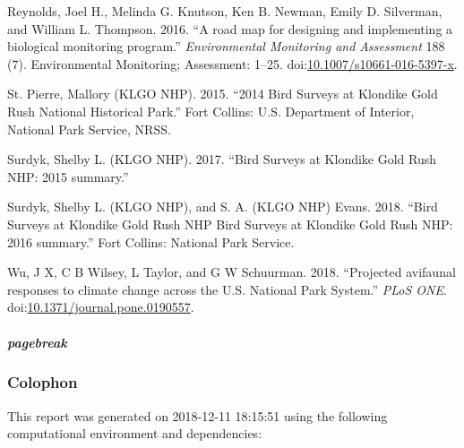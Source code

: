 \documentclass[]{article}
\let\oldsubparagraph\subparagraph
\renewcommand{\subparagraph}[1]{\oldsubparagraph{#1}\mbox{}}
\begin{document}
\hypertarget{ref-Reynolds2016}{}
Reynolds, Joel H., Melinda G. Knutson, Ken B. Newman, Emily D.
Silverman, and William L. Thompson. 2016. ``A road map for designing and
implementing a biological monitoring program.'' \emph{Environmental
Monitoring and Assessment} 188 (7). Environmental Monitoring;
Assessment: 1--25.
doi:\href{https://doi.org/10.1007/s10661-016-5397-x}{10.1007/s10661-016-5397-x}.

\hypertarget{ref-St.Pierre2015}{}
St. Pierre, Mallory (KLGO NHP). 2015. ``2014 Bird Surveys at Klondike
Gold Rush National Historical Park.'' Fort Collins: U.S. Department of
Interior, National Park Service, NRSS.

\hypertarget{ref-Surdyk2017}{}
Surdyk, Shelby L. (KLGO NHP). 2017. ``Bird Surveys at Klondike Gold Rush
NHP: 2015 summary.''

\hypertarget{ref-Surdyk2018}{}
Surdyk, Shelby L. (KLGO NHP), and S. A. (KLGO NHP) Evans. 2018. ``Bird
Surveys at Klondike Gold Rush NHP Bird Surveys at Klondike Gold Rush
NHP: 2016 summary.'' Fort Collins: National Park Service.

\hypertarget{ref-Wu2018}{}
Wu, J X, C B Wilsey, L Taylor, and G W Schuurman. 2018. ``Projected
avifaunal responses to climate change across the U.S. National Park
System.'' \emph{PLoS ONE}.
doi:\href{https://doi.org/10.1371/journal.pone.0190557}{10.1371/journal.pone.0190557}.

\subparagraph{pagebreak}\label{pagebreak-1}

\subsubsection{Colophon}\label{colophon}

This report was generated on 2018-12-11 18:15:51 using the following
computational environment and dependencies:
\end{document}
